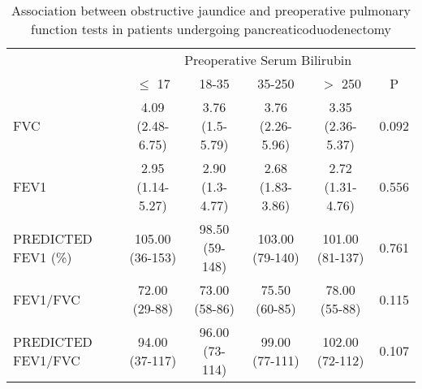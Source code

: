 \begin{sidewaystable}[htbp]
	\caption{Association between obstructive jaundice and preoperative pulmonary function tests in patients undergoing pancreaticoduodenectomy }
	\label{table:cpet_oj_table3}
	\centering
	\renewcommand{\arraystretch}{1.4} %
	\setlength{\tabcolsep}{9pt} %
	
	\begin{tabular}{l c c c c c}
		                    &                 \multicolumn{5}{c}{Preoperative Serum Bilirubin}                 \\
		                    & $\leq$ 17        & 18-35           & 35-250           & $>$ 250          & P     \\ \hline
		FVC                 & 4.09 (2.48-6.75) & 3.76 (1.5-5.79) & 3.76 (2.26-5.96) & 3.35 (2.36-5.37) & 0.092 \\
		FEV1                & 2.95 (1.14-5.27) & 2.90 (1.3-4.77) & 2.68 (1.83-3.86) & 2.72 (1.31-4.76) & 0.556 \\
		PREDICTED FEV1 (\%) & 105.00 (36-153)  & 98.50 (59-148)  & 103.00 (79-140)  & 101.00 (81-137)  & 0.761 \\
		FEV1/FVC            & 72.00 (29-88)    & 73.00 (58-86)   & 75.50 (60-85)    & 78.00 (55-88)    & 0.115 \\
		PREDICTED FEV1/FVC  & 94.00 (37-117)   & 96.00 (73-114)  & 99.00 (77-111)   & 102.00 (72-112)  & 0.107 \\ \hline
	\end{tabular}
\end{sidewaystable}